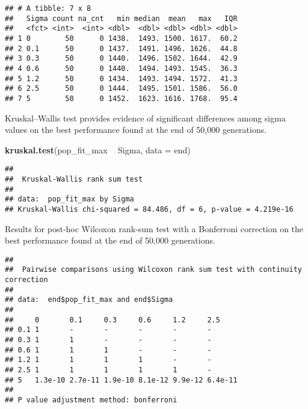 \documentclass[]{book}
\newenvironment{Shaded}{\begin{snugshade}}{\end{snugshade}}
\newcommand{\DataTypeTok}[1]{\textcolor[rgb]{0.13,0.29,0.53}{#1}}
\newcommand{\KeywordTok}[1]{\textcolor[rgb]{0.13,0.29,0.53}{\textbf{#1}}}
\newcommand{\NormalTok}[1]{#1}
\newcommand{\OperatorTok}[1]{\textcolor[rgb]{0.81,0.36,0.00}{\textbf{#1}}}
\newcommand{\OtherTok}[1]{\textcolor[rgb]{0.56,0.35,0.01}{#1}}
\newcommand{\StringTok}[1]{\textcolor[rgb]{0.31,0.60,0.02}{#1}}
\begin{document}
\begin{verbatim}
## # A tibble: 7 x 8
##   Sigma count na_cnt   min median  mean   max   IQR
##   <fct> <int>  <int> <dbl>  <dbl> <dbl> <dbl> <dbl>
## 1 0        50      0 1438.  1493. 1500. 1617.  60.2
## 2 0.1      50      0 1437.  1491. 1496. 1626.  44.8
## 3 0.3      50      0 1440.  1496. 1502. 1644.  42.9
## 4 0.6      50      0 1440.  1494. 1493. 1545.  36.3
## 5 1.2      50      0 1434.  1493. 1494. 1572.  41.3
## 6 2.5      50      0 1444.  1495. 1501. 1586.  56.0
## 7 5        50      0 1452.  1623. 1616. 1768.  95.4
\end{verbatim}

Kruskal--Wallis test provides evidence of significant differences among sigma values on the best performance found at the end of 50,000 generations.

\begin{Shaded}
\begin{Highlighting}[]
\KeywordTok{kruskal.test}\NormalTok{(pop_fit_max }\OperatorTok{~}\StringTok{ }\NormalTok{Sigma, }\DataTypeTok{data =}\NormalTok{ end)}
\end{Highlighting}
\end{Shaded}

\begin{verbatim}
## 
##  Kruskal-Wallis rank sum test
## 
## data:  pop_fit_max by Sigma
## Kruskal-Wallis chi-squared = 84.486, df = 6, p-value = 4.219e-16
\end{verbatim}

Results for post-hoc Wilcoxon rank-sum test with a Bonferroni correction on the best performance found at the end of 50,000 generations.

\begin{Shaded}
\end{Shaded}

\begin{verbatim}
## 
##  Pairwise comparisons using Wilcoxon rank sum test with continuity correction 
## 
## data:  end$pop_fit_max and end$Sigma 
## 
##     0       0.1     0.3     0.6     1.2     2.5    
## 0.1 1       -       -       -       -       -      
## 0.3 1       1       -       -       -       -      
## 0.6 1       1       1       -       -       -      
## 1.2 1       1       1       1       -       -      
## 2.5 1       1       1       1       1       -      
## 5   1.3e-10 2.7e-11 1.9e-10 8.1e-12 9.9e-12 6.4e-11
## 
## P value adjustment method: bonferroni
\end{verbatim}
\end{document}
